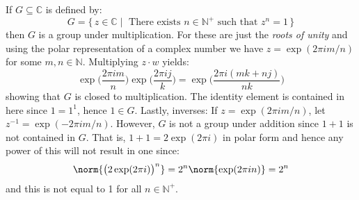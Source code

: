     \begin{example}
        If $G\subseteq\mathbb{C}$ is defined by:
        \begin{equation}
            G=\{\,z\in\mathbb{C}\;|\;
                \textrm{ There exists }n\in\mathbb{N}^{+}
                \textrm{ such that }z^{n}=1\,\}
        \end{equation}
        then $G$ is a group under multiplication. For these are just the
        \textit{roots of unity} and using the polar representation of a
        complex number we have $z=\exp(2\pi{i}m/n)$ for some
        $m,n\in\mathbb{N}$. Multiplying $z\cdot{w}$ yields:
        \begin{equation}
            \exp\Big(\frac{2\pi{i}m}{n}\Big)
                \exp\Big(\frac{2\pi{i}j}{k}\Big)
            =\exp\Big(\frac{2\pi{i}(mk+nj)}{nk}\Big)
        \end{equation}
        showing that $G$ is closed to multiplication. The identity element
        is contained in here since $1=1^{1}$, hence $1\in{G}$. Lastly,
        inverses: If $z=\exp(2\pi{i}m/n)$, let
        $z^{\minus{1}}=\exp(\minus{2}\pi{i}m/n)$. However, $G$ is not a
        group under addition since $1+1$ is not contained in $G$.
        That is, $1+1=2\exp(2\pi{i})$ in polar form and hence any power of
        this will not result in one since:
        \begin{equation}
            \norm{\big(2\exp(2\pi{i})\big)^{n}}
            =2^{n}\norm{\exp(2\pi{i}n)}=2^{n}
        \end{equation}
        and this is not equal to 1 for all $n\in\mathbb{N}^{+}$.
    \end{example}
